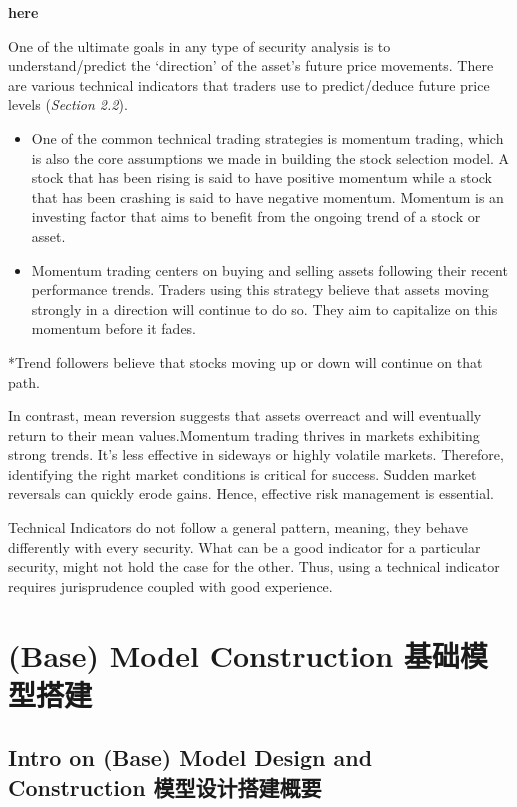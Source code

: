 \documentclass[
]{book}
\begin{document}
\textbf{here}

One of the ultimate goals in any type of security analysis is to
understand/predict the `direction' of the asset's future price
movements. There are various technical indicators that traders use to
predict/deduce future price levels (\emph{Section 2.2}).

\begin{itemize}
\item
  One of the common technical trading strategies is momentum trading,
  which is also the core assumptions we made in building the stock
  selection model. A stock that has been rising is said to have positive
  momentum while a stock that has been crashing is said to have negative
  momentum. Momentum is an investing factor that aims to benefit from
  the ongoing trend of a stock or asset.
\item
  Momentum trading centers on buying and selling assets following their
  recent performance trends. Traders using this strategy believe that
  assets moving strongly in a direction will continue to do so. They aim
  to capitalize on this momentum before it fades.
\end{itemize}

*Trend followers believe that stocks moving up or down will continue on
that path.

In contrast, mean reversion suggests that assets overreact and will
eventually return to their mean values.Momentum trading thrives in
markets exhibiting strong trends. It's less effective in sideways or
highly volatile markets. Therefore, identifying the right market
conditions is critical for success. Sudden market reversals can quickly
erode gains. Hence, effective risk management is essential.

Technical Indicators do not follow a general pattern, meaning, they
behave differently with every security. What can be a good indicator for
a particular security, might not hold the case for the other. Thus,
using a technical indicator requires jurisprudence coupled with good
experience.

\hypertarget{base-model-construction-ux57faux7840ux6a21ux578bux642dux5efa}{%
\chapter{(Base) Model Construction
基础模型搭建}\label{base-model-construction-ux57faux7840ux6a21ux578bux642dux5efa}}

\hypertarget{intro-on-base-model-design-and-construction-ux6a21ux578bux8bbeux8ba1ux642dux5efaux6982ux8981}{%
\section{Intro on (Base) Model Design and Construction
模型设计搭建概要}\label{intro-on-base-model-design-and-construction-ux6a21ux578bux8bbeux8ba1ux642dux5efaux6982ux8981}}
\end{document}
